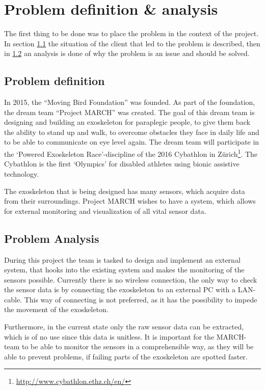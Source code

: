 \section{Problem definition \& analysis} \label{sec:probdef}
The first thing to be done was to place the problem in the context of the project. In section \ref{sec:prodef} the situation of the client that led to the problem is described, then in \ref{sec:proana} an analysis is done of why the problem is an issue and should be solved.

\subsection{Problem definition}\label{sec:prodef}
In 2015, the ``Moving Bird Foundation'' was founded. As part of the foundation, the dream team ``Project MARCH'' was created. The goal of this dream team is designing and building an exoskeleton for paraplegic people, to give them back the ability to stand up and walk, to overcome obstacles they face in daily life and to be able to communicate on eye level again. The dream team will participate in the `Powered Exoskeleton Race'-discipline of the 2016 Cybathlon in Zürich\footnote{\url{http://www.cybathlon.ethz.ch/en/}}. The Cybathlon is the first `Olympics' for disabled athletes using bionic assistive technology.
 
The exoskeleton that is being designed has many sensors, which acquire data from their surroundings. Project MARCH wishes to have a system, which allows for external monitoring and visualization of all vital sensor data.

\subsection{Problem Analysis}\label{sec:proana}
During this project the team is tasked to design and implement an external system, that hooks into the existing system and makes the monitoring of the sensors possible. Currently there is no wireless connection, the only way to check the sensor data is by connecting the exoskeleton to an external PC with a LAN-cable. This way of connecting is not preferred, as it has the possibility to impede the movement of the exoskeleton.

Furthermore, in the current state only the raw sensor data can be extracted, which is of no use since this data is unitless. It is important for the MARCH-team to be able to monitor the sensors in a comprehensible way, as they will be able to prevent problems, if failing parts of the exoskeleton are spotted faster.